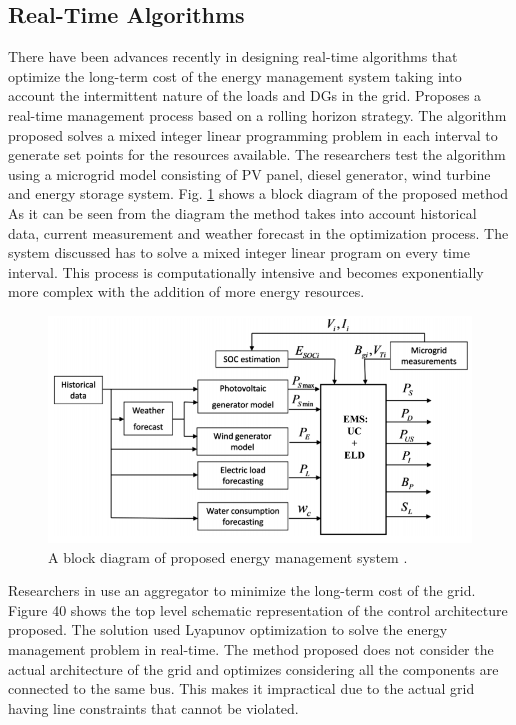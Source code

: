 \subsection{Real-Time Algorithms}
There have been advances recently in designing real-time algorithms that optimize the long-term cost of the energy management system taking into account the intermittent nature of the loads and DGs in the grid. \cite{RPa13} Proposes a real-time management process based on a rolling horizon strategy. The algorithm proposed solves a mixed integer linear programming problem in each interval to generate set points for the resources available. The researchers test the algorithm using a microgrid model consisting of PV panel, diesel generator, wind turbine and energy storage system. Fig. \ref{fig:RT_1} shows a block diagram of the proposed method As it can be seen from the diagram the method takes into account historical data, current measurement and weather forecast in the optimization process. The system discussed has to solve a mixed integer linear program on every time interval. This process is computationally intensive and becomes exponentially more complex with the addition of more energy resources.
\begin{figure}[!h]
\centering
\includegraphics[width=0.85\linewidth]{figs/RT_1.png}
\caption[A block diagram of proposed energy management system]{A block diagram of proposed energy management system  \cite{RPa13}.}
\label{fig:RT_1}
\end{figure}

 Researchers in \cite{Sun14} use an aggregator to minimize the long-term cost of the grid. Figure 40 shows the top level schematic representation of the control architecture proposed. The solution used Lyapunov optimization to solve the energy management problem in real-time. The method proposed does not consider the actual architecture of the grid and optimizes considering all the components are connected to the same bus. This makes it impractical due to the actual grid having line constraints that cannot be violated.

